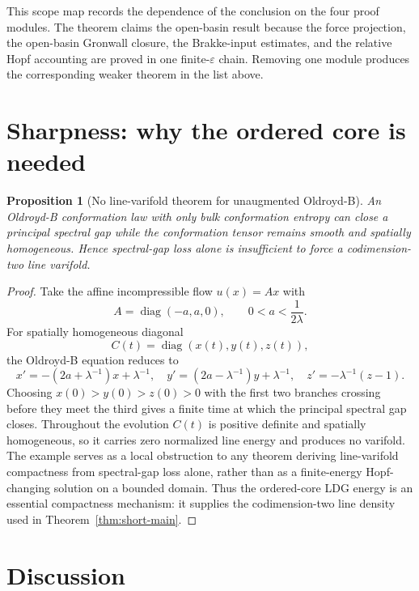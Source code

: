 \documentclass[11pt]{article}
\newtheorem{proposition}[theorem]{Proposition}
\theoremstyle{definition}
\newcommand{\eps}{\varepsilon}
\begin{document}
This scope map records the dependence of the conclusion on the four proof
modules.  The theorem claims the open-basin result because the force
projection, the open-basin Gronwall closure, the Brakke-input estimates, and the
relative Hopf accounting are proved in one finite-\(\eps\) chain.  Removing one
module produces the corresponding weaker theorem in the list above.

\section{Sharpness: why the ordered core is needed}
\label{sec:sharpness}

\begin{proposition}[No line-varifold theorem for unaugmented Oldroyd-B]
\label{prop:short-nogo}
An Oldroyd-B conformation law with only bulk conformation entropy can close a
principal spectral gap while the conformation tensor remains smooth and
spatially homogeneous.  Hence spectral-gap loss alone is insufficient to force
a codimension-two line varifold.
\end{proposition}

\begin{proof}
Take the affine incompressible flow \(u(x)=Ax\) with
\[
        A=\operatorname{diag}(-a,a,0),
        \qquad
        0<a<\frac{1}{2\lambda}.
\]
For spatially homogeneous diagonal
\[
        C(t)=\operatorname{diag}(x(t),y(t),z(t)),
\]
the Oldroyd-B equation reduces to
\[
        x'=-(2a+\lambda^{-1})x+\lambda^{-1},\quad
        y'=(2a-\lambda^{-1})y+\lambda^{-1},\quad
        z'=-\lambda^{-1}(z-1).
\]
Choosing \(x(0)>y(0)>z(0)>0\) with the first two branches crossing before they
meet the third gives a finite time at which the principal spectral gap closes.
Throughout the evolution \(C(t)\) is positive definite and spatially
homogeneous, so it carries zero normalized line energy and produces no
varifold.  The example serves as a local obstruction to any theorem deriving
line-varifold compactness from spectral-gap loss alone, rather than as a
finite-energy Hopf-changing solution on a bounded domain.  Thus the
ordered-core LDG energy is an essential compactness mechanism: it supplies the
codimension-two line density used in Theorem~\ref{thm:short-main}.
\end{proof}

\section{Discussion}
\label{sec:discussion}
\end{document}
